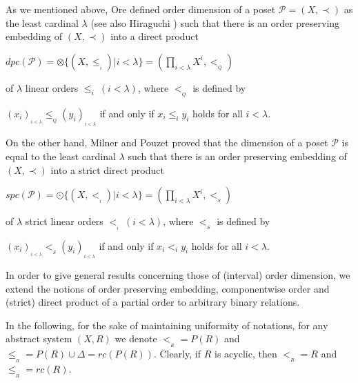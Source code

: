 \documentclass{article}
\theoremstyle{definition}
\begin{document}
As we mentioned above,
Ore \cite{ore} defined order dimension of a poset $\mathcal{P}=(X,\prec)$ as the least cardinal $\lambda$ (see also Hiraguchi \cite{hir}) such that there is an order preserving embedding  of $(X,\prec)$ into a direct product
\begin{center}
$dpc(\mathcal{P})=\otimes\{(X,\leq_{_i})\vert i<\lambda\}=(\displaystyle\prod_{i<\lambda}X^i,<_{_{Q}})$ 
\end{center}
of $\lambda$ linear orders
$\leq_i\ (i<\lambda)$, where
$<_{_Q}$ is defined by
\begin{center}
$(x_{i})_{_{i<\lambda}}\leq_{_Q} (y_{i})_{_{i<\lambda}}$ if and only if $x_{i}\leq_i y_{i}$ holds 
for all $i<\lambda$.
\end{center}
On the other hand, Milner and Pouzet \cite{MP}
proved that the dimension of a poset $\mathcal{P}$ is equal to the least cardinal $\lambda$
such that there is an order preserving embedding  of $(X,\prec)$ into a strict direct product
\begin{center}
$spc(\mathcal{P})=\odot\{(X,<_{_i})\vert i<\lambda\}=(\displaystyle\prod_{i<\lambda}X^i,<_{_S})$ 
\end{center}
of $\lambda$ strict linear orders
$\mathcal{<}_{_i}\ (i<\lambda)$, where $<_{_S}$ is defined by
\begin{center}
$(x_{i})_{_{i<\lambda}}<_{_S} (y_{i})_{_{i<\lambda}}$ if and only if $x_{i}<_i y_{i}$ holds for all $i<\lambda$.
\end{center}









 In order to give general results concerning those of (interval) order dimension, we extend
 the notions of order preserving embedding, componentwise order and (strict) direct product of a partial order to arbitrary binary relations.
 


In the following,
for the sake of maintaining uniformity of notations, for any  abstract system $(X,R)$ we denote 
$<_{_R}=P(R)$ and $\leq_{_{R}}=P(R)\cup \Delta=rc(P(R))$. Clearly, if $R$ is acyclic, then
$<_{_R}=R$ and $\leq_{_{R}}=rc(R)$.
\end{document}
